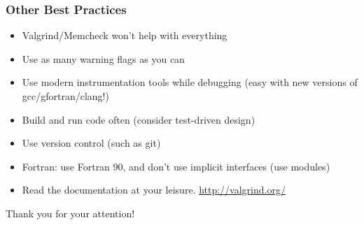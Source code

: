 \documentclass{beamer}
\begin{document}
\begin{frame}[fragile]
\frametitle{Other Best Practices}
\begin{itemize}
\item Valgrind/Memcheck won't help with everything
\item Use as many warning flags as you can
\item Use modern instrumentation tools while debugging (easy with new versions of gcc/gfortran/clang!)
\item Build and run code often (consider test-driven design)
\item Use version control (such as git)
\item Fortran: use Fortran 90, and don't use implicit interfaces (use modules)
\item Read the documentation at your leisure. \url{http://valgrind.org/}
\end{itemize}
Thank you for your attention!
\end{frame}
\end{document}
